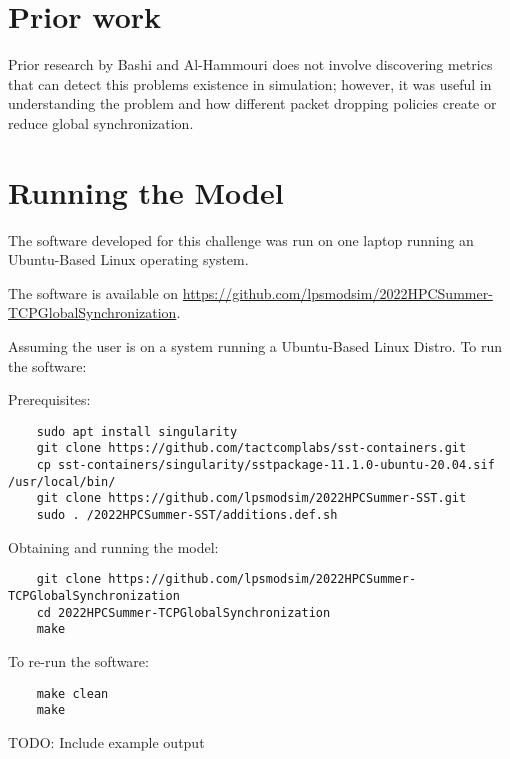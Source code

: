 \documentclass{article}
\begin{document}
\section{Prior work} %
Prior research by Bashi and Al-Hammouri \cite{Bashi2017} does not involve discovering metrics that can detect this problems existence in simulation; however, it was useful in understanding the problem and how different packet dropping policies create or reduce global synchronization.

\section{Running the Model}

The software developed for this challenge was run on one laptop running an Ubuntu-Based Linux operating system.

\noindent The software is available on \href{https://github.com/lpsmodsim/2022HPCSummer-TCPGlobalSynchronization}{https://github.com/lpsmodsim/2022HPCSummer-TCPGlobalSynchronization}.\newline

\noindent Assuming the user is on a system running a Ubuntu-Based Linux Distro. To run the software:\newline

\noindent Prerequisites: 

\begin{verbatim}
	sudo apt install singularity
	git clone https://github.com/tactcomplabs/sst-containers.git
	cp sst-containers/singularity/sstpackage-11.1.0-ubuntu-20.04.sif /usr/local/bin/
	git clone https://github.com/lpsmodsim/2022HPCSummer-SST.git
	sudo . /2022HPCSummer-SST/additions.def.sh
\end{verbatim}

\noindent Obtaining and running the model:

\begin{verbatim}
	git clone https://github.com/lpsmodsim/2022HPCSummer-TCPGlobalSynchronization
	cd 2022HPCSummer-TCPGlobalSynchronization
	make
\end{verbatim}

\noindent To re-run the software:

\begin{verbatim}
	make clean
	make
\end{verbatim}

\noindent TODO: Include example output\newline
\end{document}
